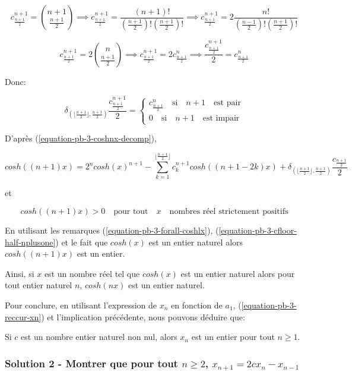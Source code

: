 \documentclass[12pt,a4paper,article]{memoir}
\newcommand{\floor}[1]{\lfloor #1 \rfloor}
\begin{document}
\[c_{\frac{n+1}{2}}^{n+1} = \binom{n+1}{\frac{n+1}{2}} \implies c_{\frac{n+1}{2}}^{n+1} = \frac{(n+1)!}{(\frac{n+1}{2})!(\frac{n+1}{2})!}  \implies c_{\frac{n+1}{2}}^{n+1} = 2 \frac{n!}{(\frac{n-1}{2})!(\frac{n+1}{2})!} \]

\[c_{\frac{n+1}{2}}^{n+1} = 2\binom{n}{\frac{n+1}{2}} \implies c_{\frac{n+1}{2}}^{n+1} = 2c_{\frac{n+1}{2}}^{n} \implies \frac{c_{\frac{n+1}{2}}^{n+1}}{2} = c_{\frac{n+1}{2}}^{n} \]

Donc: 

\begin{equation}
\delta_{(\floor{\frac{n+1}{2}}, \frac{n+1}{2})} \frac{c_{\frac{n+1}{2}}^{n+1}}{2} = \left\{
	\begin{array}{l}
	c_{\frac{n+1}{2}}^{n} \quad \textrm{si} \quad n+1 \quad \textrm{est pair}\\
	0 \quad \textrm{si} \quad n+1 \quad \textrm{est impair}
	\end{array}
\right.
\label{equation-pb-3-cfloor-half-nplusone}
\end{equation}

D'après (\ref{equation-pb-3-coshnx-decomp}),

\[cosh((n+1)x) = 2^{n}cosh(x)^{n+1} - \sum_{k=1}^{\floor{\frac{n+1}{2}}} c_{k}^{n+1} cosh((n+1-2k)x) + \delta_{(\floor{\frac{n+1}{2}}, \frac{n+1}{2})} \frac{c_{\frac{n+1}{2}}}{2}\]

et 

\[cosh((n+1)x) > 0 \quad \textrm{pour tout} \quad x \quad \textrm{nombres réel strictement positifs}\]

En utilisant les remarques (\ref{equation-pb-3-forall-coshlx}), (\ref{equation-pb-3-cfloor-half-nplusone}) et le fait que $cosh(x)$ est un entier naturel alors $cosh((n+1)x)$ est un entier.

\bigskip

Ainsi, si $x$ est un nombre réel tel que $cosh(x)$ est un entier naturel alors pour tout entier naturel $n$, $cosh(nx)$ est un entier naturel.

\bigskip

Pour conclure, en utilisant l'expression de $x_{n}$ en fonction de $a_{1}$, (\ref{equation-pb-3-reccur-xn}) et l'implication précédente, nous pouvons déduire que:

\bigskip

Si $c$ est un nombre entier naturel non nul, alors $x_{n}$ est un entier pour tout $n \geq 1$.
 
\subsubsection{Solution 2 - Montrer que pour tout $n \geq 2$, $x_{n+1} = 2cx_{n} - x_{n-1}$}
\end{document}
